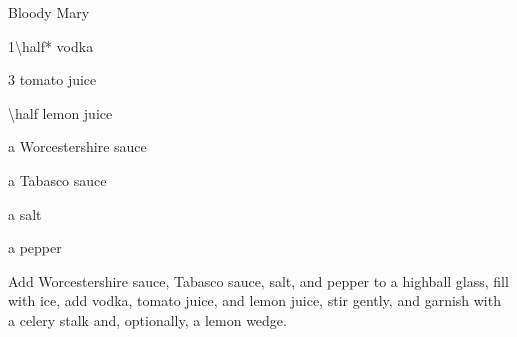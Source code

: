 %	
%	


\printindex




\begin{Cocktail}{Bloody Mary}
	\begin{Ingredients}\normalsize
	\item \SI{1\half*}{\oz} vodka
	\item \SI{3}{\oz} tomato juice
	\item \SI{\half}{\oz} lemon juice
	\item a \si{\dash} Worcestershire sauce
	\item a \si{\dash} Tabasco sauce
	\item a \si{\dash} salt
	\item a \si{\dash} pepper
	\end{Ingredients}
	
	\begin{Instructions}\small
	Add Worcestershire sauce, Tabasco sauce, salt, and pepper to a highball glass, fill with ice, add vodka, tomato juice, and lemon juice, stir gently, and garnish with a celery stalk and, optionally, a lemon wedge.
	\end{Instructions}
\end{Cocktail}

